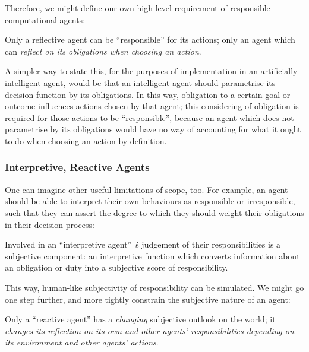 Therefore, we might define our own high-level requirement of responsible computational agents:

\begin{displayquote}
    Only a reflective agent can be ``responsible'' for its actions; only an agent which can \emph{reflect on its obligations when choosing an action}.
\end{displayquote}\par

A simpler way to state this, for the purposes of implementation in an artificially intelligent agent, would be that an intelligent agent should parametrise its decision function by its obligations. In this way, obligation to a certain goal or outcome influences actions chosen by that agent; this considering of obligation is required for those actions to be ``responsible'', because an agent which does not parametrise by its obligations would have no way of accounting for what it ought to do when choosing an action by definition.\par

\subsubsection{Interpretive, Reactive Agents}
One can imagine other useful limitations of scope, too. For example, an agent should be able to interpret their own behaviours as responsible or irresponsible, such that they can assert the degree to which they should weight their obligations in their decision process:\par

\begin{displayquote}
    Involved in an ``interpretive agent''~\'s judgement of their responsibilities is a subjective component: an interpretive function which converts information about an obligation or duty into a subjective score of responsibility.
\end{displayquote}\par

This way, human-like subjectivity of responsibility can be simulated. We might go one step further, and more tightly constrain the subjective nature of an agent:\par

\begin{displayquote}
    Only a ``reactive agent'' has a \emph{changing} subjective outlook on the world; it \emph{changes its reflection on its own and other agents' responsibilities depending on its environment and other agents' actions}.
\end{displayquote}\par

